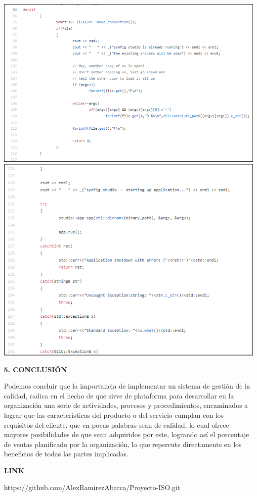 \documentclass[10pt,a4paper]{article}
\begin{document}
\begin{center}
\includegraphics[scale=1]{Imagen9.png}
\includegraphics[scale=1]{Imagen10.png}
\end{center}
\vspace{\baselineskip}
\textbf{5. CONCLUSIÓN}
\vspace{\baselineskip}

Podemos concluir que la importancia de implementar un sistema de gestión de la calidad, radica en el hecho de que sirve de plataforma para desarrollar en la organización una serie de actividades, procesos y procedimientos, encaminados a lograr que las características del producto o del servicio cumplan con los requisitos del cliente, que en pocas palabras sean de calidad, lo cual ofrece mayores posibilidades de que sean adquiridos por este, logrando así el porcentaje de ventas planificado por la organización, lo que repercute directamente en los beneficios de todas las partes implicadas.

\vspace{\baselineskip}
\textbf{LINK}

https://github.com/AlexRamirezAbarca/Proyecto-ISO.git
\end{document}
